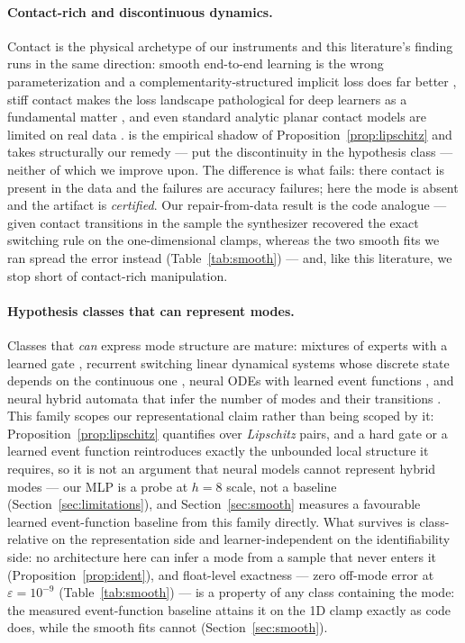 \paragraph{Contact-rich and discontinuous dynamics.} Contact is the physical archetype of our instruments and this literature's finding runs in the same direction: smooth end-to-end learning is the wrong parameterization and a complementarity-structured implicit loss does far better \citep{pfrommer2021contactnets}, stiff contact makes the loss landscape pathological for deep learners as a fundamental matter \citep{parmar2021stiff}, and even standard analytic planar contact models are limited on real data \citep{fazeli2020limitations,fazeli2017contact}. \citet{parmar2021stiff} is the empirical shadow of Proposition~\ref{prop:lipschitz} and \citet{pfrommer2021contactnets} takes structurally our remedy --- put the discontinuity in the hypothesis class --- neither of which we improve upon. The difference is what fails: there contact is present in the data and the failures are accuracy failures; here the mode is absent and the artifact is \emph{certified}. Our repair-from-data result is the code analogue --- given contact transitions in the sample the synthesizer recovered the exact switching rule on the one-dimensional clamps, whereas the two smooth fits we ran spread the error instead (Table~\ref{tab:smooth}) --- and, like this literature, we stop short of contact-rich manipulation.

\paragraph{Hypothesis classes that can represent modes.} Classes that \emph{can} express mode structure are mature: mixtures of experts with a learned gate \citep{jacobs1991moe}, recurrent switching linear dynamical systems whose discrete state depends on the continuous one \citep{linderman2017rslds}, neural ODEs with learned event functions \citep{chen2021eventfn}, and neural hybrid automata that infer the number of modes and their transitions \citep{poli2021nha}. This family scopes our representational claim rather than being scoped by it: Proposition~\ref{prop:lipschitz} quantifies over \emph{Lipschitz} pairs, and a hard gate or a learned event function reintroduces exactly the unbounded local structure it requires, so it is not an argument that neural models cannot represent hybrid modes --- our MLP is a probe at $h = 8$ scale, not a baseline (Section~\ref{sec:limitations}), and Section~\ref{sec:smooth} measures a favourable learned event-function baseline from this family directly. What survives is class-relative on the representation side and learner-independent on the identifiability side: no architecture here can infer a mode from a sample that never enters it (Proposition~\ref{prop:ident}), and float-level exactness --- zero off-mode error at $\varepsilon = 10^{-9}$ (Table~\ref{tab:smooth}) --- is a property of any class containing the mode: the measured event-function baseline attains it on the 1D clamp exactly as code does, while the smooth fits cannot (Section~\ref{sec:smooth}).

